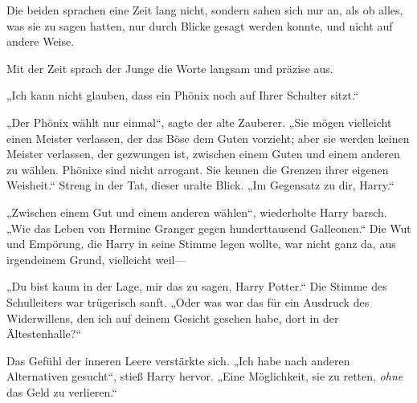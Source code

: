 Die beiden sprachen eine Zeit lang nicht, sondern sahen sich nur an, als ob alles, was sie zu sagen hatten, nur durch Blicke gesagt werden konnte, und nicht auf andere Weise.

Mit der Zeit sprach der Junge die Worte langsam und präzise aus.

„Ich kann nicht glauben, dass ein Phönix noch auf Ihrer Schulter sitzt.“

„Der Phönix wählt nur einmal“, sagte der alte Zauberer. „Sie mögen vielleicht einen Meister verlassen, der das Böse dem Guten vorzieht; aber sie werden keinen Meister verlassen, der gezwungen ist, zwischen einem Guten und einem anderen zu wählen. Phönixe sind nicht arrogant. Sie kennen die Grenzen ihrer eigenen Weisheit.“
Streng in der Tat, dieser uralte Blick. „Im Gegensatz zu dir, Harry.“

„Zwischen einem Gut und einem anderen wählen“, wiederholte Harry barsch. „Wie das Leben von Hermine Granger gegen hunderttausend Galleonen.“
Die Wut und Empörung, die Harry in seine Stimme legen wollte, war nicht ganz da, aus irgendeinem Grund, vielleicht weil—

„Du bist kaum in der Lage, mir das zu sagen, Harry Potter.“
Die Stimme des Schulleiters war trügerisch sanft.
„Oder was war das für ein Ausdruck des Widerwillens, den ich auf deinem Gesicht gesehen habe, dort in der Ältestenhalle?“

Das Gefühl der inneren Leere verstärkte sich.
„Ich habe nach anderen Alternativen gesucht“, stieß Harry hervor. „Eine Möglichkeit, sie zu retten, \emph{ohne} das Geld zu verlieren.“

